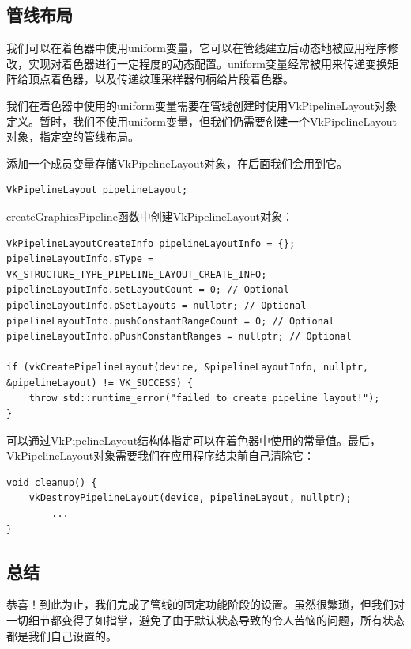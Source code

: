 \documentclass{ctexart}
\begin{document}
\subsection{管线布局}

我们可以在着色器中使用uniform变量，它可以在管线建立后动态地被应用程序修改，实现对着色器进行一定程度的动态配置。uniform变量经常被用来传递变换矩阵给顶点着色器，以及传递纹理采样器句柄给片段着色器。

我们在着色器中使用的uniform变量需要在管线创建时使用VkPipelineLayout对象定义。暂时，我们不使用uniform变量，但我们仍需要创建一个VkPipelineLayout对象，指定空的管线布局。

添加一个成员变量存储VkPipelineLayout对象，在后面我们会用到它。

\begin{lstlisting}[language={[ANSI]C}]
VkPipelineLayout pipelineLayout;
\end{lstlisting}

createGraphicsPipeline函数中创建VkPipelineLayout对象：

\begin{lstlisting}[language={[ANSI]C}]
VkPipelineLayoutCreateInfo pipelineLayoutInfo = {};
pipelineLayoutInfo.sType = VK_STRUCTURE_TYPE_PIPELINE_LAYOUT_CREATE_INFO;
pipelineLayoutInfo.setLayoutCount = 0; // Optional
pipelineLayoutInfo.pSetLayouts = nullptr; // Optional
pipelineLayoutInfo.pushConstantRangeCount = 0; // Optional
pipelineLayoutInfo.pPushConstantRanges = nullptr; // Optional

if (vkCreatePipelineLayout(device, &pipelineLayoutInfo, nullptr, &pipelineLayout) != VK_SUCCESS) {
	throw std::runtime_error("failed to create pipeline layout!");
}
\end{lstlisting}

可以通过VkPipelineLayout结构体指定可以在着色器中使用的常量值。最后，VkPipelineLayout对象需要我们在应用程序结束前自己清除它：

\begin{lstlisting}[language={[ANSI]C}]
void cleanup() {
	vkDestroyPipelineLayout(device, pipelineLayout, nullptr);
		...
}
\end{lstlisting}

\subsection{总结}

恭喜！到此为止，我们完成了管线的固定功能阶段的设置。虽然很繁琐，但我们对一切细节都变得了如指掌，避免了由于默认状态导致的令人苦恼的问题，所有状态都是我们自己设置的。
\end{document}

